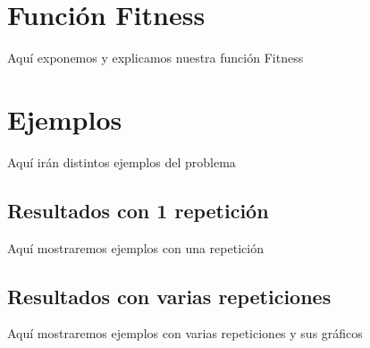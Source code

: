 \documentclass[11pt, a4paper, titlepage]{article}
\begin{document}
\newpage

\section{Función Fitness}
Aquí exponemos y explicamos nuestra función Fitness

\section{Ejemplos}
Aquí irán distintos ejemplos del problema

\subsection{Resultados con 1 repetición}
Aquí mostraremos ejemplos con una repetición

\subsection{Resultados con varias repeticiones}
Aquí mostraremos ejemplos con varias repeticiones y sus gráficos
\end{document}
